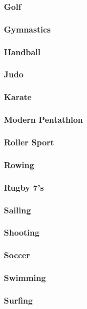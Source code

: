 			\subsubsection{Golf}
			\subsubsection{Gymnastics}
			\subsubsection{Handball}
			\subsubsection{Judo}
			\subsubsection{Karate}
			\subsubsection{Modern Pentathlon}
			\subsubsection{Roller Sport}
			\subsubsection{Rowing}
			\subsubsection{Rugby 7's}
			\subsubsection{Sailing}
			\subsubsection{Shooting}
			\subsubsection{Soccer}
			\subsubsection{Swimming}
			\subsubsection{Surfing}
